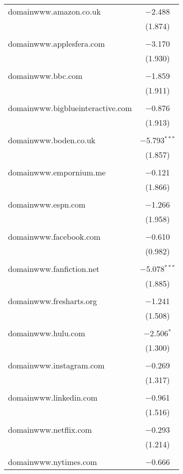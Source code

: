 \begin{table}[!htbp]
\begin{tabular}{@{\extracolsep{5pt}}lc}
 domainwww.amazon.co.uk & $-$2.488 \\ 
  & (1.874) \\ 
  & \\ 
 domainwww.applesfera.com & $-$3.170 \\ 
  & (1.930) \\ 
  & \\ 
 domainwww.bbc.com & $-$1.859 \\ 
  & (1.911) \\ 
  & \\ 
 domainwww.bigblueinteractive.com & $-$0.876 \\ 
  & (1.913) \\ 
  & \\ 
 domainwww.boden.co.uk & $-$5.793$^{***}$ \\ 
  & (1.857) \\ 
  & \\ 
 domainwww.empornium.me & $-$0.121 \\ 
  & (1.866) \\ 
  & \\ 
 domainwww.espn.com & $-$1.266 \\ 
  & (1.958) \\ 
  & \\ 
 domainwww.facebook.com & $-$0.610 \\ 
  & (0.982) \\ 
  & \\ 
 domainwww.fanfiction.net & $-$5.078$^{***}$ \\ 
  & (1.885) \\ 
  & \\ 
 domainwww.fresharts.org & $-$1.241 \\ 
  & (1.508) \\ 
  & \\ 
 domainwww.hulu.com & $-$2.506$^{*}$ \\ 
  & (1.300) \\ 
  & \\ 
 domainwww.instagram.com & $-$0.269 \\ 
  & (1.317) \\ 
  & \\ 
 domainwww.linkedin.com & $-$0.961 \\ 
  & (1.516) \\ 
  & \\ 
 domainwww.netflix.com & $-$0.293 \\ 
  & (1.214) \\ 
  & \\ 
 domainwww.nytimes.com & $-$0.666 \\ 

\end{tabular}
\end{table}
